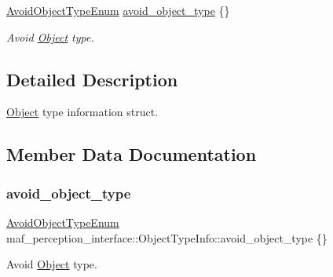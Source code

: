 \begin{DoxyCompactItemize}
\hyperlink{structmaf__perception__interface_1_1AvoidObjectTypeEnum}{Avoid\+Object\+Type\+Enum} \hyperlink{structmaf__perception__interface_1_1ObjectTypeInfo_a9570e409fddeff0a350fabba04fac884}{avoid\+\_\+object\+\_\+type} \{\}
\begin{DoxyCompactList}\small\item\em Avoid \hyperlink{structmaf__perception__interface_1_1Object}{Object} type. \end{DoxyCompactList}\end{DoxyCompactItemize}


\subsection{Detailed Description}
\hyperlink{structmaf__perception__interface_1_1Object}{Object} type information struct. 

\subsection{Member Data Documentation}
\mbox{\label{structmaf__perception__interface_1_1ObjectTypeInfo_a9570e409fddeff0a350fabba04fac884}} 
\subsubsection{\texorpdfstring{avoid\+\_\+object\+\_\+type}{avoid\_object\_type}}
{\footnotesize\ttfamily \hyperlink{structmaf__perception__interface_1_1AvoidObjectTypeEnum}{Avoid\+Object\+Type\+Enum} maf\+\_\+perception\+\_\+interface\+::\+Object\+Type\+Info\+::avoid\+\_\+object\+\_\+type \{\}}



Avoid \hyperlink{structmaf__perception__interface_1_1Object}{Object} type. 

\mbox{\label{structmaf__perception__interface_1_1ObjectTypeInfo_a6f2ade1dde6684a63abd80f1e86fcba5}} 
